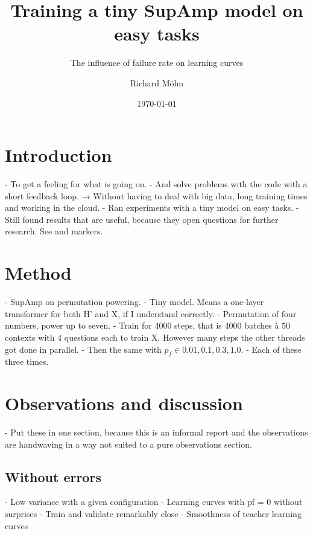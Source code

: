 \documentclass{farlamp}
\title{Training a tiny SupAmp model on easy tasks}
\subtitle{The influence of failure rate on learning curves}
\author{Richard Möhn}
\date{\today}
\begin{document}
\maketitle
\tableofcontents

\section{Introduction}

- To get a feeling for what is going on.
- And solve problems with the code with a short feedback loop. → Without having
to deal with big data, long training times and working in the cloud.
- Ran experiments with a tiny model on easy tasks.
- Still found results that are useful, because they open questions for further
research. See \OQ and \TODO markers.


\section{Method}

- SupAmp on permutation powering.
- Tiny model. Means a one-layer transformer for both H' and X, if I understand
correctly.
- Permutation of four numbers, power up to seven.
- Train for 4000 steps, that is 4000 batches à 50 contexts with 4 questions each
to train X. However many steps the other threads got done in parallel.
- Then the same with $p_f \in {0.01, 0.1, 0.3, 1.0}$.
- Each of these three times.


\section{Observations and discussion}

- Put these in one section, because this is an informal report and the
observations are handwaving in a way not suited to a pure observations section.

\subsection{Without errors}

- Low variance with a given configuration
- Learning curves with pf = 0 without surprises
- Train and validate remarkably close
- Smoothness of teacher learning curves
\end{document}
